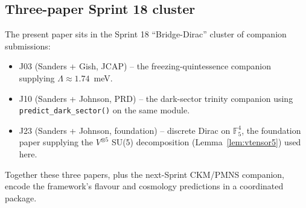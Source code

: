 \documentclass[11pt,reqno]{amsart}
\theoremstyle{plain}
\theoremstyle{definition}
\theoremstyle{remark}
\newcommand{\F}{\mathbb{F}}
\begin{document}
\subsection{Three-paper Sprint 18 cluster}
The present paper sits in the Sprint 18 ``Bridge-Dirac'' cluster
of companion submissions:
\begin{itemize}\setlength\itemsep{0pt}
\item J03 (Sanders + Gish, JCAP) -- the freezing-quintessence
companion supplying $\Lambda \approx 1.74$~meV.
\item J10 (Sanders + Johnson, PRD) -- the dark-sector trinity
companion using \texttt{predict\_dark\_sector()} on the same
module.
\item J23 (Sanders + Johnson, foundation) -- discrete Dirac on
$\F_{5}^{4}$, the foundation paper supplying the $V^{\otimes 5}$
SU(5) decomposition (Lemma~\ref{lem:vtensor5}) used here.
\end{itemize}
Together these three papers, plus the next-Sprint CKM/PMNS
companion, encode the framework's flavour and cosmology
predictions in a coordinated package.
\end{document}
